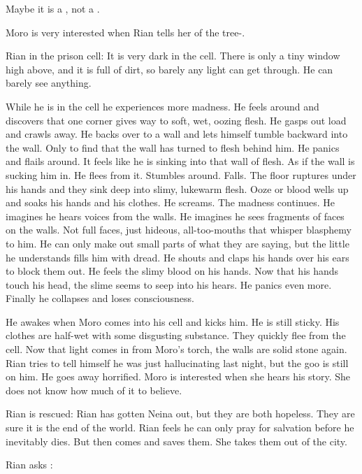   Maybe it is a \human, not a \scatha. 
  
  Moro is very interested when Rian tells her of the tree-\sphyle. 
  
Rian in the prison cell:
  It is very dark in the cell.
  There is only a tiny window high above, and it is full of dirt, so barely any light can get through.
  He can barely see anything. 
  
  While he is in the cell he experiences more madness. 
  He feels around and discovers that one corner gives way to soft, wet, oozing flesh. 
  He gasps out load and crawls away. 
  He backs over to a wall and lets himself tumble backward into the wall.
  Only to find that the wall has turned to flesh behind him. 
  He panics and flails around.
  It feels like he is sinking into that wall of flesh.
  As if the wall is sucking him in. 
  He flees from it. 
  Stumbles around. 
  Falls. 
  The floor ruptures under his hands and they sink deep into slimy, lukewarm flesh.
  Ooze or blood wells up and soaks his hands and his clothes. 
  He screams. 
  The madness continues.
  He imagines he hears voices from the walls. 
  He imagines he sees fragments of faces on the walls.
  Not full faces, just hideous, all-too-\human mouths that whisper blasphemy to him. 
  He can only make out small parts of what they are saying, but the little he understands fills him with dread. 
  He shouts and claps his hands over his ears to block them out.
  He feels the slimy blood on his hands. 
  Now that his hands touch his head, the slime seems to seep into his hears. 
  He panics even more. 
  Finally he collapses and loses consciousness.
  
  He awakes when Moro comes into his cell and kicks him.
  He is still sticky.
  His clothes are half-wet with some disgusting substance. 
  They quickly flee from the cell. 
  Now that light comes in from Moro's torch, the walls are solid stone again.
  Rian tries to tell himself he was just hallucinating last night, but the goo is still on him. 
  He goes away horrified. 
  Moro is interested when she hears his story.
  She does not know how much of it to believe. 

Rian is rescued:
  Rian has gotten Neina out, but they are both hopeless.
  They are sure it is the end of the world.
  Rian feels he can only pray for salvation before he inevitably dies. 
  But then \Criseis comes and saves them. 
  She takes them out of the city.
  
  Rian asks \Criseis: 
  
